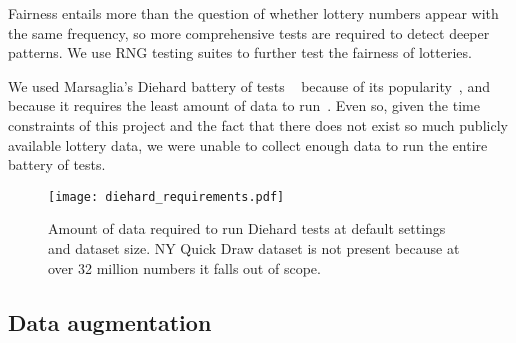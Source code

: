 
Fairness entails more than the question of whether lottery numbers appear with the same frequency, so more comprehensive tests are required to detect deeper patterns. We use RNG testing suites to further test the fairness of lotteries.


We used Marsaglia's Diehard battery of tests ~\cite{diehard} because of its popularity~\cite{dieharder}, and because it requires the least amount of data to run~\cite{datasize-dieharder}. Even so, given the time constraints of this project and the fact that there does not exist so much publicly available lottery data, we were unable to collect enough data to run the entire battery of tests.
\begin{figure}
    \centering
    \texttt{[image: diehard\_requirements.pdf]}
    \caption{Amount of data required to run Diehard tests at default settings and dataset size. NY Quick Draw dataset is not present because at over 32 million numbers it falls out of scope.}
    \label{fig:requirements}
\end{figure}

\subsection{Data augmentation}


